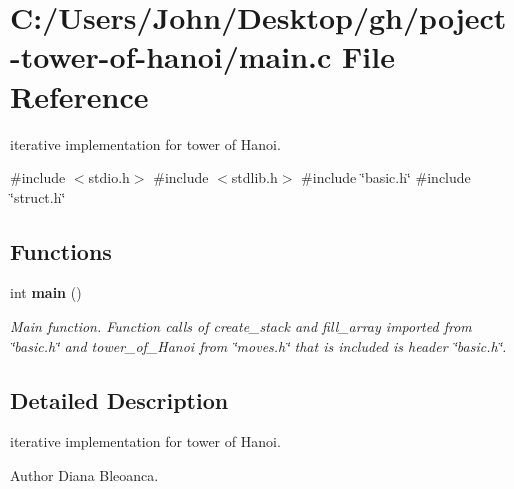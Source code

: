 \section{C\+:/\+Users/\+John/\+Desktop/gh/poject-\/tower-\/of-\/hanoi/main.c File Reference}
\label{main_8c}


iterative implementation for tower of Hanoi.  


{\ttfamily \#include $<$stdio.\+h$>$}\newline
{\ttfamily \#include $<$stdlib.\+h$>$}\newline
{\ttfamily \#include \char`\"{}basic.\+h\char`\"{}}\newline
{\ttfamily \#include \char`\"{}struct.\+h\char`\"{}}\newline
\subsection*{Functions}
\begin{DoxyCompactItemize}
\item 
\mbox{\label{main_8c_ae66f6b31b5ad750f1fe042a706a4e3d4}} 
int \textbf{ main} ()
\begin{DoxyCompactList}\small\item\em Main function. Function calls of create\+\_\+stack and fill\+\_\+array imported from \char`\"{}basic.\+h\char`\"{} and tower\+\_\+of\+\_\+\+Hanoi from \char`\"{}moves.\+h\char`\"{} that is included is header \char`\"{}basic.\+h\char`\"{}. \end{DoxyCompactList}\end{DoxyCompactItemize}


\subsection{Detailed Description}
iterative implementation for tower of Hanoi. 

\begin{DoxyAuthor}{Author}
Diana Bleoanca. 
\end{DoxyAuthor}
